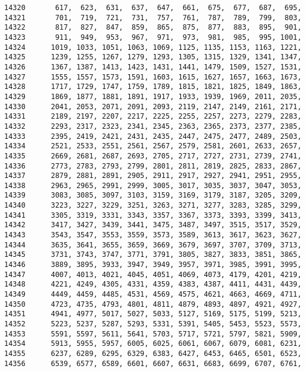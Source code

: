 \begin{Code}
\begin{verbatim}
14320       617,  623,  631,  637,  647,  661,  675,  677,  687,  695, 
14321       701,  719,  721,  731,  757,  761,  787,  789,  799,  803,
14322       817,  827,  847,  859,  865,  875,  877,  883,  895,  901,
14323       911,  949,  953,  967,  971,  973,  981,  985,  995, 1001,
14324      1019, 1033, 1051, 1063, 1069, 1125, 1135, 1153, 1163, 1221,
14325      1239, 1255, 1267, 1279, 1293, 1305, 1315, 1329, 1341, 1347,
14326      1367, 1387, 1413, 1423, 1431, 1441, 1479, 1509, 1527, 1531,
14327      1555, 1557, 1573, 1591, 1603, 1615, 1627, 1657, 1663, 1673, 
14328      1717, 1729, 1747, 1759, 1789, 1815, 1821, 1825, 1849, 1863,
14329      1869, 1877, 1881, 1891, 1917, 1933, 1939, 1969, 2011, 2035,
14330      2041, 2053, 2071, 2091, 2093, 2119, 2147, 2149, 2161, 2171,
14331      2189, 2197, 2207, 2217, 2225, 2255, 2257, 2273, 2279, 2283,
14332      2293, 2317, 2323, 2341, 2345, 2363, 2365, 2373, 2377, 2385,
14333      2395, 2419, 2421, 2431, 2435, 2447, 2475, 2477, 2489, 2503, 
14334      2521, 2533, 2551, 2561, 2567, 2579, 2581, 2601, 2633, 2657,
14335      2669, 2681, 2687, 2693, 2705, 2717, 2727, 2731, 2739, 2741,
14336      2773, 2783, 2793, 2799, 2801, 2811, 2819, 2825, 2833, 2867,
14337      2879, 2881, 2891, 2905, 2911, 2917, 2927, 2941, 2951, 2955,
14338      2963, 2965, 2991, 2999, 3005, 3017, 3035, 3037, 3047, 3053,
14339      3083, 3085, 3097, 3103, 3159, 3169, 3179, 3187, 3205, 3209,
14340      3223, 3227, 3229, 3251, 3263, 3271, 3277, 3283, 3285, 3299,
14341      3305, 3319, 3331, 3343, 3357, 3367, 3373, 3393, 3399, 3413,
14342      3417, 3427, 3439, 3441, 3475, 3487, 3497, 3515, 3517, 3529,
14343      3543, 3547, 3553, 3559, 3573, 3589, 3613, 3617, 3623, 3627,
14344      3635, 3641, 3655, 3659, 3669, 3679, 3697, 3707, 3709, 3713,
14345      3731, 3743, 3747, 3771, 3791, 3805, 3827, 3833, 3851, 3865,
14346      3889, 3895, 3933, 3947, 3949, 3957, 3971, 3985, 3991, 3995,
14347      4007, 4013, 4021, 4045, 4051, 4069, 4073, 4179, 4201, 4219,
14348      4221, 4249, 4305, 4331, 4359, 4383, 4387, 4411, 4431, 4439,
14349      4449, 4459, 4485, 4531, 4569, 4575, 4621, 4663, 4669, 4711,
14350      4723, 4735, 4793, 4801, 4811, 4879, 4893, 4897, 4921, 4927,
14351      4941, 4977, 5017, 5027, 5033, 5127, 5169, 5175, 5199, 5213,
14352      5223, 5237, 5287, 5293, 5331, 5391, 5405, 5453, 5523, 5573,
14353      5591, 5597, 5611, 5641, 5703, 5717, 5721, 5797, 5821, 5909,
14354      5913, 5955, 5957, 6005, 6025, 6061, 6067, 6079, 6081, 6231,
14355      6237, 6289, 6295, 6329, 6383, 6427, 6453, 6465, 6501, 6523,
14356      6539, 6577, 6589, 6601, 6607, 6631, 6683, 6699, 6707, 6761,

\end{verbatim}
\end{Code}
